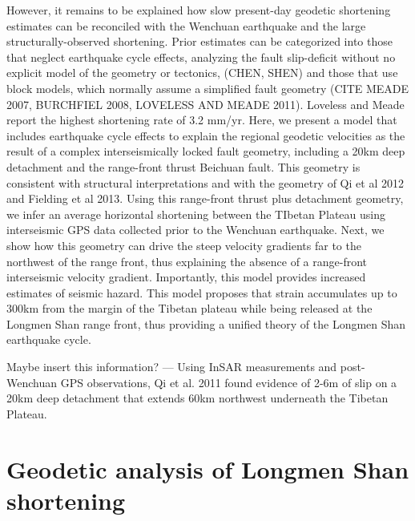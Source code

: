 \documentclass[12pt]{article}
\begin{document}
However, it remains to be explained how slow present-day geodetic shortening estimates can be reconciled with the Wenchuan earthquake and the large structurally-observed shortening. Prior estimates can be categorized into those that neglect earthquake cycle effects, analyzing the fault slip-deficit without no explicit model of the geometry or tectonics, (CHEN, SHEN) and those that use block models, which normally assume a simplified fault geometry (CITE MEADE 2007, BURCHFIEL 2008, LOVELESS AND MEADE 2011). Loveless and Meade report the highest shortening rate of 3.2 mm/yr.  Here, we present a model that includes earthquake cycle effects to explain the regional geodetic velocities as the result of a complex interseismically locked fault geometry, including a 20km deep detachment and the range-front thrust Beichuan fault.  This geometry is consistent with structural interpretations and with the geometry of Qi et al 2012 and Fielding et al 2013.  Using this range-front thrust plus detachment geometry, we infer an average horizontal shortening between the TIbetan Plateau using interseismic GPS data collected prior to the Wenchuan earthquake.  Next, we show how this geometry can drive the steep velocity gradients far to the northwest of the range front, thus explaining the absence of a range-front interseismic velocity gradient. Importantly, this model provides increased estimates of seismic hazard. This model proposes that strain accumulates up to 300km from the margin of the Tibetan plateau while being released at the Longmen Shan range front, thus providing a unified theory of the Longmen Shan earthquake cycle. 

Maybe insert this information? --- Using InSAR measurements and post-Wenchuan GPS observations, Qi et al. 2011 found evidence of 2-6m of slip on a 20km deep detachment that extends 60km northwest underneath the Tibetan Plateau. 

\section{Geodetic analysis of Longmen Shan shortening}
\end{document}
